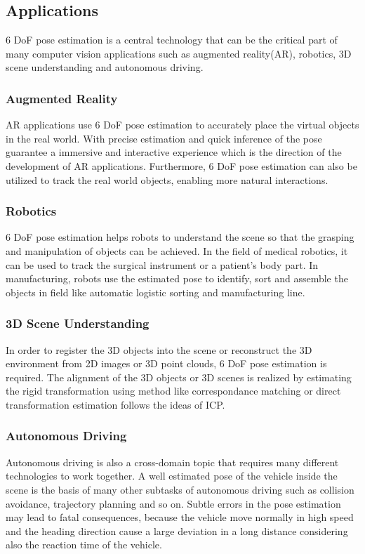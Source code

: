 \documentclass[12pt,DIV14,BCOR12mm,a4paper,footinclude=false,headinclude,parskip=half-,twoside,openright,cleardoublepage=empty,toc=index,bibliography=totoc,listof=totoc]{scrreprt}
\numberwithin{equation}{chapter}
\begin{document}
\subsection{Applications}
6 DoF pose estimation is a central technology that can be the critical part of many computer vision applications such as augmented reality(AR), robotics, 3D scene understanding and autonomous driving.

\subsubsection{Augmented Reality}
AR applications use 6 DoF pose estimation to accurately place the virtual objects in the real world. With precise estimation and quick inference of the pose guarantee a immersive and interactive experience 
which is the direction of the development of AR applications\cite{9836663}. Furthermore, 6 DoF pose estimation can also be utilized to track the real world objects, enabling more natural interactions.

\subsubsection{Robotics}
6 DoF pose estimation helps robots to understand the scene so that the grasping and manipulation of objects can be achieved. In the field of medical robotics, it can be used to track the surgical instrument or a patient's body part\cite{cao20236impose}. In manufacturing, robots use the estimated pose to identify, sort and assemble the objects in field like automatic logistic sorting and manufacturing line.

\subsubsection{3D Scene Understanding}
In order to register the 3D objects into the scene or reconstruct the 3D environment from 2D images or 3D point clouds, 6 DoF pose estimation is required. The alignment of the 3D objects or 3D scenes is realized by estimating the rigid transformation using method like correspondance matching\cite{qin2022geometric} or direct transformation estimation\cite{fu2021robust} follows the ideas of ICP\cite{Besl1992AMF}.

\subsubsection{Autonomous Driving}
Autonomous driving is also a cross-domain topic that requires many different technologies to work together. A well estimated pose of the vehicle inside the scene is the basis of many other subtasks of autonomous driving such as collision avoidance, trajectory planning and so on. Subtle errors in the pose estimation may lead to fatal consequences\cite{auto}, because the vehicle move normally in high speed and the heading direction cause a large deviation in a long distance considering also the reaction time of the vehicle.
\end{document}

